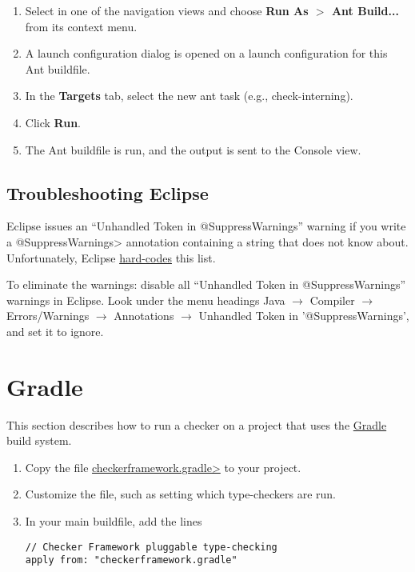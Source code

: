 \begin{enumerate}

\item
  Select  in one of the navigation views and choose
  {\bf Run As $>$ Ant Build...} from its context menu.

\item
  A launch configuration dialog is opened on a launch configuration
  for this Ant buildfile.

\item
  In the {\bf Targets} tab, select the new ant task (e.g., check-interning).

\item
  Click {\bf Run}.

\item
  The Ant buildfile is run, and the output is sent to the Console view.

\end{enumerate}


\subsection{Troubleshooting Eclipse\label{eclipse-troubleshooting}}

Eclipse issues an ``Unhandled Token in @SuppressWarnings'' warning if you
write a \<@SuppressWarnings> annotation containing a string that does not
know about.  Unfortunately, Eclipse
\href{https://bugs.eclipse.org/bugs/show_bug.cgi?id=122475}{hard-codes}
this list.

To eliminate the warnings:
disable all ``Unhandled Token in @SuppressWarnings'' warnings in Eclipse.
Look under the menu headings Java $\rightarrow$ Compiler $\rightarrow$ Errors/Warnings $\rightarrow$ Annotations $\rightarrow$ Unhandled Token in '@SuppressWarnings', and set it to ignore.


\section{Gradle\label{gradle}}

This section describes how to run a checker
on a project that uses the \href{https://gradle.org/}{Gradle} build system.

\begin{enumerate}
\item
  Copy the file
  \href{https://raw.githubusercontent.com/typetools/checker-framework/master/docs/manual/checkerframework.gradle}{\<checkerframework.gradle>}
  to your project.

\item
  Customize the file, such as setting which type-checkers are run.

\item
  In your main buildfile, add the lines
\begin{Verbatim}
// Checker Framework pluggable type-checking
apply from: "checkerframework.gradle"
\end{Verbatim}

\end{enumerate}


